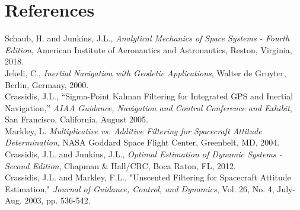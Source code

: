 \documentclass[12pt]{report}
\begin{document}
\newpage
\section*{References}

\noindent [1] Schaub, H. and Junkins, J.L., \textit{Analytical Mechanics of Space Systems - Fourth Edition}, American Institute of Aeronautics and Astronautics, Reston, Virginia, 2018.\\
\noindent [2] Jekeli, C., \textit{Inertial Navigation with Geodetic Applications}, Walter de Gruyter, Berlin, Germany, 2000.\\
\noindent [3] Crassidis, J.L., “Sigma-Point Kalman Filtering for Integrated GPS and Inertial Navigation,” \textit{AIAA Guidance, Navigation and Control Conference and Exhibit},
San Francisco, California, August 2005.\\
\noindent [4] Markley, L. \textit{Multiplicative vs. Additive Filtering for Spacecraft Attitude Determination}, NASA Goddard Space Flight Center, Greenbelt, MD, 2004. \\
\noindent [5] Crassidis, J.L. and Junkins, J.L., \textit{Optimal Estimation of Dynamic Systems - Second Edition}, Chapman \& Hall/CRC, Boca Raton, FL, 2012.\\
\noindent [6] Crassidis, J.L. and Markley, F.L., "Unscented Filtering for Spacecraft Attitude Estimation," \textit{Journal of Guidance, Control, and Dynamics}, Vol. 26, No. 4, July-Aug. 2003, pp. 536-542.
\end{document}
